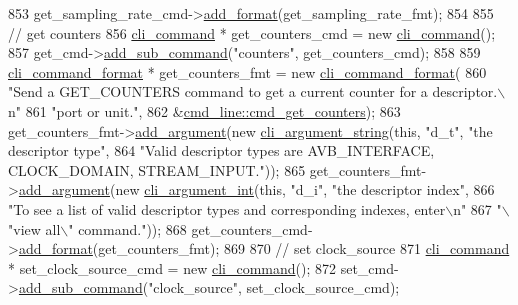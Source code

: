 \begin{DoxyCode}
853     get\_sampling\_rate\_cmd->\hyperlink{classcli__command_aa9ec38e761644d946f8db2b920e39921}{add\_format}(get\_sampling\_rate\_fmt);
854 
855     \textcolor{comment}{// get counters}
856     \hyperlink{classcli__command}{cli\_command} * get\_counters\_cmd = \textcolor{keyword}{new} \hyperlink{classcli__command}{cli\_command}();
857     get\_cmd->\hyperlink{classcli__command_aa73a67e8ebb6facd4b40ced66279b226}{add\_sub\_command}(\textcolor{stringliteral}{"counters"}, get\_counters\_cmd);
858 
859     \hyperlink{classcli__command__format}{cli\_command\_format} * get\_counters\_fmt = \textcolor{keyword}{new} 
      \hyperlink{classcli__command__format}{cli\_command\_format}(
860         \textcolor{stringliteral}{"Send a GET\_COUNTERS command to get a current counter for a descriptor.\(\backslash\)n"}
861         \textcolor{stringliteral}{"port or unit."},
862         &\hyperlink{classcmd__line_a0755c104c8ceca24300025ecf1ed1c4d}{cmd\_line::cmd\_get\_counters});
863     get\_counters\_fmt->\hyperlink{classcli__command__format_ac3fc6d13a227c195d5ee6f7b78eba9cd}{add\_argument}(\textcolor{keyword}{new} \hyperlink{classcli__argument__string}{cli\_argument\_string}(\textcolor{keyword}{this}, \textcolor{stringliteral}{"d\_t"}, \textcolor{stringliteral}{"the
       descriptor type"},
864                                                            \textcolor{stringliteral}{"Valid descriptor types are AVB\_INTERFACE,
       CLOCK\_DOMAIN, STREAM\_INPUT."}));
865     get\_counters\_fmt->\hyperlink{classcli__command__format_ac3fc6d13a227c195d5ee6f7b78eba9cd}{add\_argument}(\textcolor{keyword}{new} \hyperlink{classcli__argument__int}{cli\_argument\_int}(\textcolor{keyword}{this}, \textcolor{stringliteral}{"d\_i"}, \textcolor{stringliteral}{"the
       descriptor index"},
866                                                         \textcolor{stringliteral}{"To see a list of valid descriptor types and
       corresponding indexes, enter\(\backslash\)n"}
867                                                         \textcolor{stringliteral}{"\(\backslash\)"view all\(\backslash\)" command."}));
868     get\_counters\_cmd->\hyperlink{classcli__command_aa9ec38e761644d946f8db2b920e39921}{add\_format}(get\_counters\_fmt);
869 
870     \textcolor{comment}{// set clock\_source}
871     \hyperlink{classcli__command}{cli\_command} * set\_clock\_source\_cmd = \textcolor{keyword}{new} \hyperlink{classcli__command}{cli\_command}();
872     set\_cmd->\hyperlink{classcli__command_aa73a67e8ebb6facd4b40ced66279b226}{add\_sub\_command}(\textcolor{stringliteral}{"clock\_source"}, set\_clock\_source\_cmd);

\end{DoxyCode}
